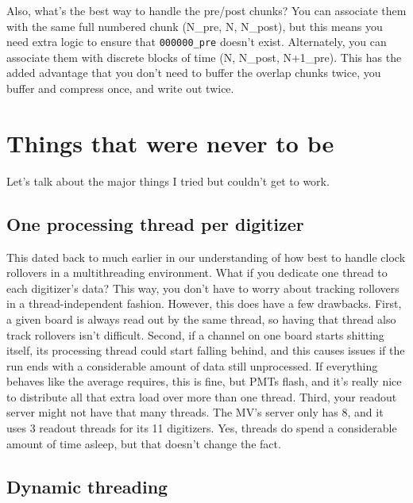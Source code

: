 Also, what's the best way to handle the pre/post chunks?
You can associate them with the same full numbered chunk (N\_pre, N, N\_post), but this means you need extra logic to ensure that \texttt{000000\_pre} doesn't exist.
Alternately, you can associate them with discrete blocks of time (N, N\_post, N+1\_pre).
This has the added advantage that you don't need to buffer the overlap chunks twice, you buffer and compress once, and write out twice.

\section{Things that were never to be}

Let's talk about the major things I tried but couldn't get to work.

\subsection{One processing thread per digitizer}

This dated back to much earlier in our understanding of how best to handle clock rollovers in a multithreading environment.
What if you dedicate one thread to each digitizer's data?
This way, you don't have to worry about tracking rollovers in a thread-independent fashion.
However, this does have a few drawbacks.
First, a given board is always read out by the same thread, so having that thread also track rollovers isn't difficult.
Second, if a channel on one board starts shitting itself, its processing thread could start falling behind, and this causes issues if the run ends with a considerable amount of data still unprocessed.
If everything behaves like the average requires, this is fine, but PMTs flash, and it's really nice to distribute all that extra load over more than one thread.
Third, your readout server might not have that many threads.
The MV's server only has 8, and it uses 3 readout threads for its 11 digitizers.
Yes, threads do spend a considerable amount of time asleep, but that doesn't change the fact.

\subsection{Dynamic threading}

